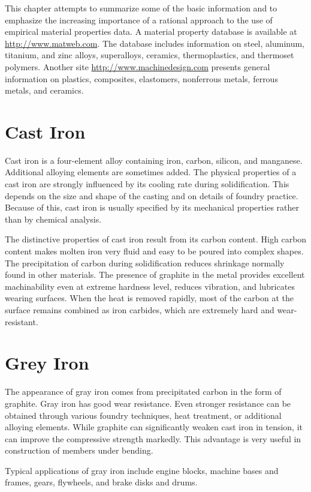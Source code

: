 \documentclass[a4paper,openany,12pt]{book}
\begin{document}
This chapter attempts to summarize some of the basic information and to
emphasize the increasing importance of a rational approach to the use of
empirical material properties data. A material property database is
available at \url{http://www.matweb.com}. The database includes
information on steel, aluminum, titanium, and zinc alloys, superalloys,
ceramics, thermoplastics, and thermoset polymers. Another site
\url{http://www.machinedesign.com} presents general information on
plastics, composites, elastomers, nonferrous metals, ferrous metals, and
ceramics.

\section{Cast Iron}
\label{cast-iron}
Cast iron is a four-element alloy containing iron, carbon, silicon, and
manganese. Additional alloying elements are sometimes added. The
physical properties of a cast iron are strongly influenced by its
cooling rate during solidification. This depends on the size and shape
of the casting and on details of foundry practice. Because of this, cast
iron is usually specified by its mechanical properties rather than by
chemical analysis.

The distinctive properties of cast iron result from its carbon content.
High carbon content makes molten iron very fluid and easy to be poured
into complex shapes. The precipitation of carbon during solidification
reduces shrinkage normally found in other materials. The presence of
graphite in the metal provides excellent machinability even at extreme
hardness level, reduces vibration, and lubricates wearing surfaces. When
the heat is removed rapidly, most of the carbon at the surface remains
combined as iron carbides, which are extremely hard and wear-resistant.

\section{Grey Iron}
\label{grey-iron}
The appearance of gray iron comes from precipitated carbon in the form
of graphite. Gray iron has good wear resistance. Even stronger
resistance can be obtained through various foundry techniques, heat
treatment, or additional alloying elements. While graphite can
significantly weaken cast iron in tension, it can improve the
compressive strength markedly. This advantage is very useful in
construction of members under bending.

Typical applications of gray iron include engine blocks, machine bases
and frames, gears, flywheels, and brake disks and drums.
\end{document}
